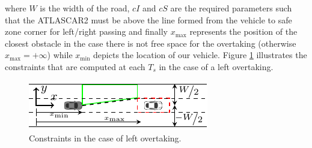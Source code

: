 where $W$ is the width of the road, $cI$ and $cS$ are the required parameters such that the ATLASCAR2 must be above the line formed from the vehicle to safe zone corner for left/right passing and finally $x_{\max}$ represents the position of the closest obstacle in the case there is not free space for the overtaking (otherwise $x_{\max}=+\infty$) while $x_{\min}$ depicts the location of our vehicle. Figure \ref{fig:constraint} illustrates the constraints that are computed at each $T_s$ in the case of a left overtaking.
\begin{figure}[!h]
	\centering
	\includegraphics[width=\textwidth]{../figure/constraint/constraint.pdf}
	\caption{Constraints in the case of left overtaking.}
	\label{fig:constraint}
\end{figure}

